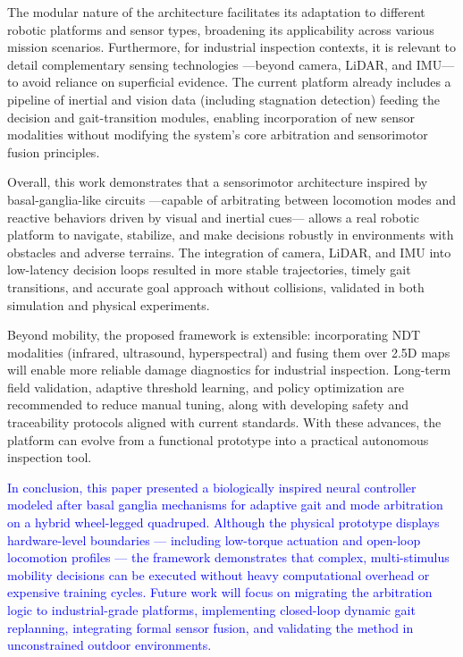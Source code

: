 \documentclass[preprint,12pt]{elsarticle}
\newcommand{\revblue}[1]{\textcolor{blue}{#1}}
\begin{document}
The modular nature of the architecture facilitates its adaptation to different robotic platforms and sensor types, broadening its applicability across various mission scenarios. Furthermore, for industrial inspection contexts, it is relevant to detail complementary sensing technologies ---beyond camera, LiDAR, and IMU--- to avoid reliance on superficial evidence. The current platform already includes a pipeline of inertial and vision data (including stagnation detection) feeding the decision and gait-transition modules, enabling incorporation of new sensor modalities without modifying the system’s core arbitration and sensorimotor fusion principles. 

Overall, this work demonstrates that a sensorimotor architecture inspired by basal-ganglia-like circuits ---capable of arbitrating between locomotion modes and reactive behaviors driven by visual and inertial cues--- allows a real robotic platform to navigate, stabilize, and make decisions robustly in environments with obstacles and adverse terrains. The integration of camera, LiDAR, and IMU into low-latency decision loops resulted in more stable trajectories, timely gait transitions, and accurate goal approach without collisions, validated in both simulation and physical experiments. 

Beyond mobility, the proposed framework is extensible: incorporating NDT modalities (infrared, ultrasound, hyperspectral) and fusing them over 2.5D maps will enable more reliable damage diagnostics for industrial inspection. Long-term field validation, adaptive threshold learning, and policy optimization are recommended to reduce manual tuning, along with developing safety and traceability protocols aligned with current standards. With these advances, the platform can evolve from a functional prototype into a practical autonomous inspection tool.

\revblue{In conclusion, this paper presented a biologically inspired neural controller modeled after basal ganglia mechanisms for adaptive gait and mode arbitration on a hybrid wheel-legged quadruped. Although the physical prototype displays hardware-level boundaries --- including low-torque actuation and open-loop locomotion profiles --- the framework demonstrates that complex, multi-stimulus mobility decisions can be executed without heavy computational overhead or expensive training cycles. Future work will focus on migrating the arbitration logic to industrial-grade platforms, implementing closed-loop dynamic gait replanning, integrating formal sensor fusion, and validating the method in unconstrained outdoor environments.}
\end{document}

